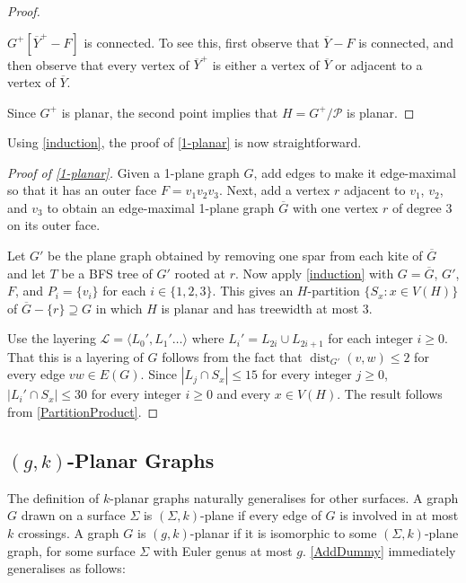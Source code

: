 \documentclass{patmorin}
\DeclareMathOperator{\dist}{dist}
\newcommand{\PP}{\mathcal{P}}
\renewcommand{\ge}{\geqslant}
\renewcommand{\le}{\leqslant}
\begin{document}
\begin{proof}
\begin{compactenum}
		\item $G^+[\overline{Y}^+-F]$ is connected. To see this, first observe that $\overline{Y}-F$ is connected, and then observe that every vertex of $\overline{Y}^+$ is either a vertex of $\overline{Y}$ or adjacent to a vertex of $\overline{Y}$.
	\end{compactenum}
	Since $G^+$ is planar, the second point implies that $H=G^+/\PP$ is planar.
\end{proof}

Using \cref{induction}, the proof of \cref{1-planar} is now straightforward.

\begin{proof}[Proof of \cref{1-planar}]
	Given a 1-plane graph $G$, add edges to make it edge-maximal so that it has an outer face $F=v_1v_2v_3$. Next, add a vertex $r$ adjacent to $v_1$, $v_2$, and $v_3$ to obtain an edge-maximal 1-plane graph $\overline{G}$ with one vertex $r$ of degree 3 on its outer face.

	Let $G'$ be the plane graph obtained by removing one spar from each kite of $\overline{G}$ and let $T$ be a BFS tree of $G'$ rooted at $r$.  Now apply \cref{induction} with $G=\overline{G}$, $G'$, $F$, and $P_i=\{v_i\}$ for each $i\in\{1,2,3\}$.  This gives an $H$-partition $\{S_x:x\in V(H)\}$ of $\overline{G}-\{r\}\supseteq G$ in which $H$ is planar and has treewidth at most 3.

	Use the layering $\mathcal{L}=\langle L_0',L_1'\ldots\rangle$ where $L_i'=L_{2i}\cup L_{2i+1}$ for each integer $i\ge 0$. That this is a layering of $G$ follows from the fact that $\dist_{G'}(v,w)\le 2$ for every edge $vw\in E(G)$.  Since $|L_j\cap S_x|\le 15$ for every integer $j\ge 0$, $|L_i'\cap S_x|\le 30$ for every integer $i\ge 0$ and every $x\in V(H)$. The result follows from \cref{PartitionProduct}.
\end{proof}

\subsection{\boldmath $(g,k)$-Planar Graphs}

The definition of $k$-planar graphs naturally generalises for other surfaces. A graph $G$ drawn on a surface $\Sigma$ is $(\Sigma,k)$-plane if every edge of $G$ is involved in at most $k$ crossings.  A graph $G$ is $(g,k)$-planar if it is isomorphic to some $(\Sigma,k)$-plane graph, for some surface $\Sigma$ with Euler genus at most $g$. \cref{AddDummy} immediately generalises as follows:
\end{document}
